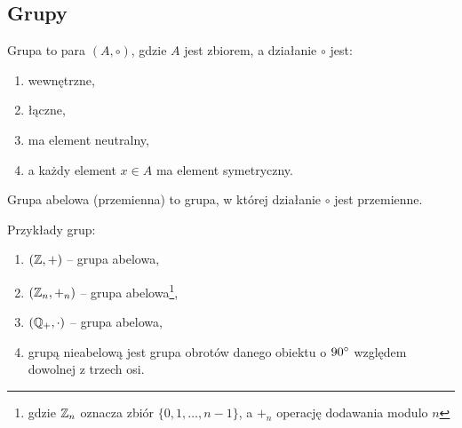 \documentclass[11pt]{scrartcl}
\begin{document}
    \subsection{Grupy}
    \begin{definition}
        Grupa to para $(A, \circ)$, gdzie $A$ jest zbiorem, a działanie $\circ$ jest:
        \begin{enumerate}
            \item wewnętrzne,
            \item łączne,
            \item ma element neutralny,
            \item a każdy element $x \in A$ ma element symetryczny.
        \end{enumerate}
    \end{definition}

    \begin{definition}
        Grupa abelowa (przemienna) to grupa, w której działanie $\circ$ jest przemienne.
    \end{definition}

    \begin{example}
        Przykłady grup:
        \begin{enumerate}
            \item $(\mathbb Z, +)$ -- grupa abelowa,
            \item $(\mathbb Z_n, +_n)$ -- grupa abelowa\footnote{gdzie $\mathbb Z_n$ oznacza zbiór $\{0, 1, \ldots, n-1\}$, a $+_n$ operację dodawania modulo $n$},
            \item $(\mathbb Q_+, \cdot)$ -- grupa abelowa,
            \item grupą nieabelową jest grupa obrotów danego obiektu o $90^\circ$ względem dowolnej z trzech osi.
        \end{enumerate}
    \end{example}
\end{document}
